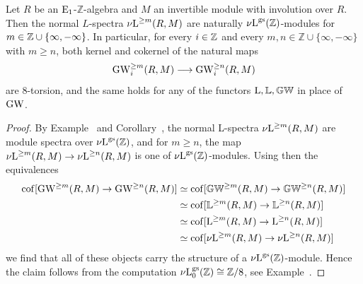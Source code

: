 \begin{corollary}
\label{corollary:normalL8tors}%
Let $R$ be an ${\mathrm{E}_{1}}$-$\mathbb Z$-algebra
and $M$ an invertible module with involution over $R$. Then the normal $L$-spectra ${\nu\!\operatorname L}^{\geq m}(R,M)$ are naturally ${\nu\!\operatorname L}^{\mathrm{gs}}(\mathbb{Z})$-modules for $m \in \mathbb{Z} \cup \{\infty,-\infty\}$. In particular, for every $i \in \mathbb{Z}$ and every $m,n \in \mathbb Z \cup \{\infty,- \infty\}$ with $m\geq n$, both kernel and cokernel of the natural maps
\[
\operatorname{GW}_i^{\geq m}(R,M) \longrightarrow \operatorname{GW}_i^{\geq n}(R,M)
\]
are $8$-torsion, and the same holds for any of the functors $\operatorname L,\mathbb{L},\mathbb{GW}$ in place of $\operatorname{GW}$.
\end{corollary}
\begin{proof}
By Example~ and Corollary~, the normal L-spectra ${\nu\!\operatorname L}^{\geq m}(R,M)$ are module spectra over ${\nu\!\operatorname L}^{\mathrm{gs}}(\mathbb{Z})$, and for $m\geq n$, the map ${\nu\!\operatorname L}^{\geq m}(R,M) \to {\nu\!\operatorname L}^{\geq n}(R,M)$ is one of ${\nu\!\operatorname L}^{\mathrm{gs}}(\mathbb{Z})$-modules. Using then the equivalences
\begin{align*}
	\operatorname{cof}[\operatorname{GW}^{\geq m}(R,M) \to \operatorname{GW}^{\geq n}(R,M)] & \simeq \operatorname{cof}[\mathbb{GW}^{\geq m}(R,M) \to \mathbb{GW}^{\geq n}(R,M)] \\
		& \simeq \operatorname{cof}[\mathbb{L}^{\geq m}(R,M) \to \mathbb{L}^{\geq n}(R,M)] \\
		& \simeq \operatorname{cof}[\operatorname L^{\geq m}(R,M) \to \operatorname L^{\geq n}(R,M)] \\
		& \simeq \operatorname{cof}[{\nu\!\operatorname L}^{\geq m}(R,M) \to {\nu\!\operatorname L}^{\geq n}(R,M)]
\end{align*}
we find that all of these objects carry the structure of a ${\nu\!\operatorname L}^{\mathrm{gs}}(\mathbb{Z})$-module. Hence the claim follows from the computation ${\nu\!\operatorname L}^{\mathrm{gs}}_0(\mathbb{Z}) \cong \mathbb{Z}/8$, see Example~.
\end{proof}

